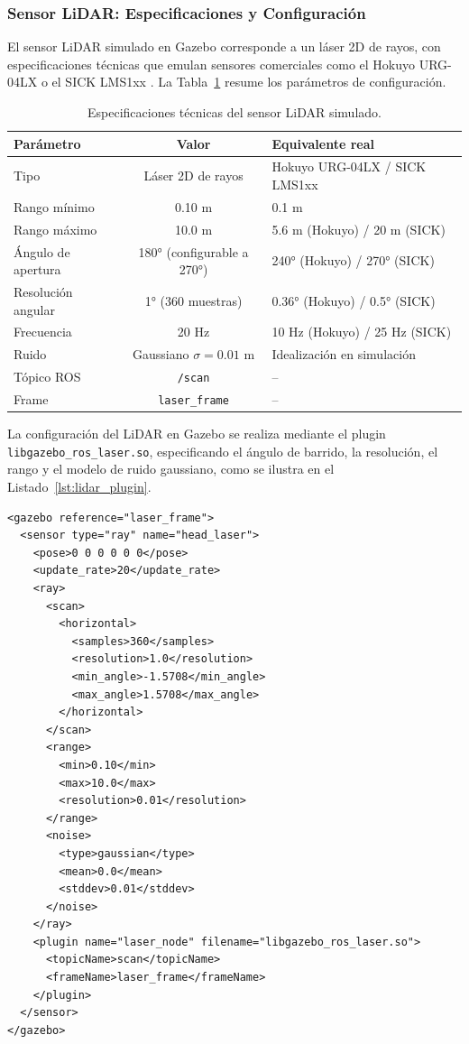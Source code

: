 \documentclass[12pt,letterpaper]{article}
\begin{document}
\subsubsection{Sensor LiDAR: Especificaciones y Configuración}
\label{sec:lidar}

El sensor LiDAR simulado en Gazebo corresponde a un láser 2D de rayos, con especificaciones técnicas que emulan sensores comerciales como el Hokuyo URG-04LX o el SICK LMS1xx \citep{siegwart2011introduction}. La Tabla~\ref{tab:lidar_spec} resume los parámetros de configuración.

\begin{table}[H]
    \centering
    \caption{Especificaciones técnicas del sensor LiDAR simulado.}
    \label{tab:lidar_spec}
    \begin{tabular}{lcl}
        \hline
        \textbf{Parámetro} & \textbf{Valor} & \textbf{Equivalente real} \\
        \hline
        Tipo & Láser 2D de rayos & Hokuyo URG-04LX / SICK LMS1xx \\
        Rango mínimo & 0.10 m & 0.1 m \\
        Rango máximo & 10.0 m & 5.6 m (Hokuyo) / 20 m (SICK) \\
        Ángulo de apertura & 180° (configurable a 270°) & 240° (Hokuyo) / 270° (SICK) \\
        Resolución angular & 1° (360 muestras) & 0.36° (Hokuyo) / 0.5° (SICK) \\
        Frecuencia & 20 Hz & 10 Hz (Hokuyo) / 25 Hz (SICK) \\
        Ruido & Gaussiano $\sigma = 0.01$ m & Idealización en simulación \\
        Tópico ROS & \texttt{/scan} & -- \\
        Frame & \texttt{laser\_frame} & -- \\
        \hline
    \end{tabular}
\end{table}

La configuración del LiDAR en Gazebo se realiza mediante el plugin \texttt{libgazebo\_ros\_laser.so}, especificando el ángulo de barrido, la resolución, el rango y el modelo de ruido gaussiano, como se ilustra en el Listado~\ref{lst:lidar_plugin}.

\begin{lstlisting}[caption={Plugin LiDAR en Gazebo.}, label={lst:lidar_plugin}, style=xmlstyle]
<gazebo reference="laser_frame">
  <sensor type="ray" name="head_laser">
    <pose>0 0 0 0 0 0</pose>
    <update_rate>20</update_rate>
    <ray>
      <scan>
        <horizontal>
          <samples>360</samples>
          <resolution>1.0</resolution>
          <min_angle>-1.5708</min_angle>
          <max_angle>1.5708</max_angle>
        </horizontal>
      </scan>
      <range>
        <min>0.10</min>
        <max>10.0</max>
        <resolution>0.01</resolution>
      </range>
      <noise>
        <type>gaussian</type>
        <mean>0.0</mean>
        <stddev>0.01</stddev>
      </noise>
    </ray>
    <plugin name="laser_node" filename="libgazebo_ros_laser.so">
      <topicName>scan</topicName>
      <frameName>laser_frame</frameName>
    </plugin>
  </sensor>
</gazebo>
\end{lstlisting}
\end{document}
